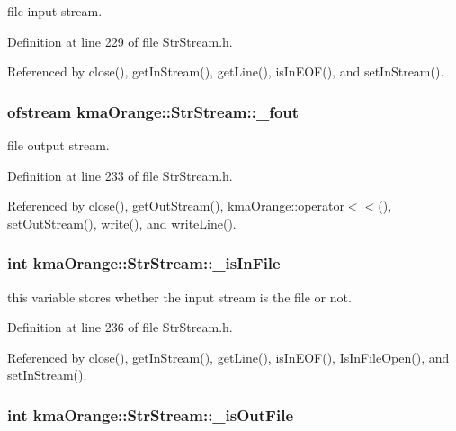 file input stream. 



Definition at line 229 of file StrStream.h.

Referenced by close(), getInStream(), getLine(), isInEOF(), and setInStream().\hypertarget{classkmaOrange_1_1StrStream_7d971213b6446bbb7fec046702959edb}{
\subsubsection[{\_\-fout}]{\setlength{\rightskip}{0pt plus 5cm}ofstream {\bf kmaOrange::StrStream::\_\-fout}}}
\label{classkmaOrange_1_1StrStream_7d971213b6446bbb7fec046702959edb}


file output stream. 



Definition at line 233 of file StrStream.h.

Referenced by close(), getOutStream(), kmaOrange::operator$<$$<$(), setOutStream(), write(), and writeLine().\hypertarget{classkmaOrange_1_1StrStream_47f0d0b245d807cefd3e6755ac27488f}{
\subsubsection[{\_\-isInFile}]{\setlength{\rightskip}{0pt plus 5cm}int {\bf kmaOrange::StrStream::\_\-isInFile}}}
\label{classkmaOrange_1_1StrStream_47f0d0b245d807cefd3e6755ac27488f}


this variable stores whether the input stream is the file or not. 



Definition at line 236 of file StrStream.h.

Referenced by close(), getInStream(), getLine(), isInEOF(), IsInFileOpen(), and setInStream().\hypertarget{classkmaOrange_1_1StrStream_7cf62f7fb6c32f88966896ed486980a0}{
\subsubsection[{\_\-isOutFile}]{\setlength{\rightskip}{0pt plus 5cm}int {\bf kmaOrange::StrStream::\_\-isOutFile}}}
\label{classkmaOrange_1_1StrStream_7cf62f7fb6c32f88966896ed486980a0}


